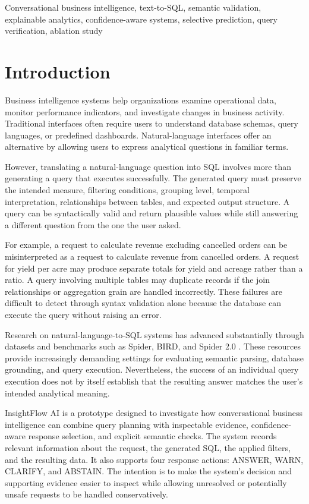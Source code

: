 \documentclass[conference]{IEEEtran}
\begin{document}
\begin{IEEEkeywords}
Conversational business intelligence, text-to-SQL, semantic validation, explainable analytics, confidence-aware systems, selective prediction, query verification, ablation study
\end{IEEEkeywords}

\section{Introduction}

Business intelligence systems help organizations examine operational data, monitor performance indicators, and investigate changes in business activity. Traditional interfaces often require users to understand database schemas, query languages, or predefined dashboards. Natural-language interfaces offer an alternative by allowing users to express analytical questions in familiar terms.

However, translating a natural-language question into SQL involves more than generating a query that executes successfully. The generated query must preserve the intended measure, filtering conditions, grouping level, temporal interpretation, relationships between tables, and expected output structure. A query can be syntactically valid and return plausible values while still answering a different question from the one the user asked.

For example, a request to calculate revenue excluding cancelled orders can be misinterpreted as a request to calculate revenue from cancelled orders. A request for yield per acre may produce separate totals for yield and acreage rather than a ratio. A query involving multiple tables may duplicate records if the join relationships or aggregation grain are handled incorrectly. These failures are difficult to detect through syntax validation alone because the database can execute the query without raising an error.

Research on natural-language-to-SQL systems has advanced substantially through datasets and benchmarks such as Spider, BIRD, and Spider 2.0 \cite{yu2018spider,li2023bird,lei2025spider2}. These resources provide increasingly demanding settings for evaluating semantic parsing, database grounding, and query execution. Nevertheless, the success of an individual query execution does not by itself establish that the resulting answer matches the user's intended analytical meaning.

InsightFlow AI is a prototype designed to investigate how conversational business intelligence can combine query planning with inspectable evidence, confidence-aware response selection, and explicit semantic checks. The system records relevant information about the request, the generated SQL, the applied filters, and the resulting data. It also supports four response actions: ANSWER, WARN, CLARIFY, and ABSTAIN. The intention is to make the system's decision and supporting evidence easier to inspect while allowing unresolved or potentially unsafe requests to be handled conservatively.
\end{document}
